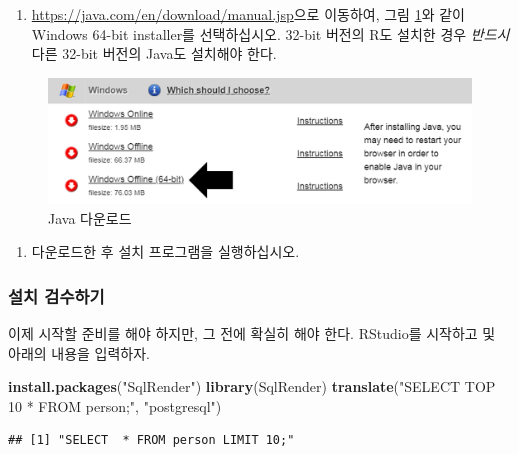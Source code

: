\documentclass[11pt]{book}
\newenvironment{Shaded}{\begin{snugshade}}{\end{snugshade}}
\newcommand{\KeywordTok}[1]{\textcolor[rgb]{0.13,0.29,0.53}{\textbf{#1}}}
\newcommand{\StringTok}[1]{\textcolor[rgb]{0.31,0.60,0.02}{#1}}
\newcommand{\NormalTok}[1]{#1}
\providecommand{\tightlist}{%
  \setlength{\itemsep}{0pt}\setlength{\parskip}{0pt}}
\theoremstyle{definition}
\theoremstyle{definition}
\theoremstyle{definition}
\theoremstyle{remark}
\begin{document}
\begin{enumerate}
\def\labelenumi{\arabic{enumi}.}
\tightlist
\item
  \url{https://java.com/en/download/manual.jsp}으로 이동하여, 그림
  \ref{fig:downloadJava}와 같이 Windows 64-bit installer를 선택하십시오.
  32-bit 버전의 R도 설치한 경우 \emph{반드시} 다른 32-bit 버전의 Java도
  설치해야 한다.
\end{enumerate}

\begin{figure}

{\centering \includegraphics[width=1\linewidth]{images/OhdsiAnalyticsTools/downloadJava} 

}

\caption{Java 다운로드}\label{fig:downloadJava}
\end{figure}

\begin{enumerate}
\def\labelenumi{\arabic{enumi}.}
\setcounter{enumi}{1}
\tightlist
\item
  다운로드한 후 설치 프로그램을 실행하십시오.
\end{enumerate}

\subsubsection*{설치 검수하기}\label{-}

이제 시작할 준비를 해야 하지만, 그 전에 확실히 해야 한다. RStudio를
시작하고 및 아래의 내용을 입력하자.

\begin{Shaded}
\begin{Highlighting}[]
\KeywordTok{install.packages}\NormalTok{(}\StringTok{"SqlRender"}\NormalTok{)}
\KeywordTok{library}\NormalTok{(SqlRender)}
\KeywordTok{translate}\NormalTok{(}\StringTok{"SELECT TOP 10 * FROM person;"}\NormalTok{, }\StringTok{"postgresql"}\NormalTok{)}
\end{Highlighting}
\end{Shaded}

\begin{verbatim}
## [1] "SELECT  * FROM person LIMIT 10;"
\end{verbatim}
\end{document}
